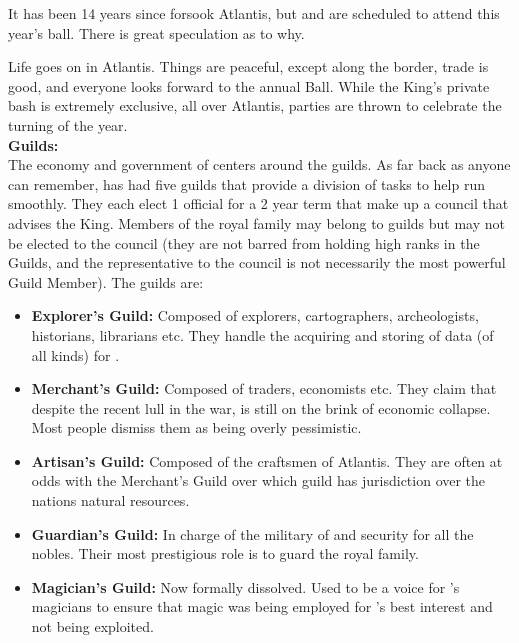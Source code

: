 \documentclass[blue]{NeptuneBall}
\begin{document}
It has been 14 years since \cAriel{\MYname{}} forsook Atlantis, but \cAriel{\they{}} and \cAriel{\their{}} \cEric{\spouse{}} are scheduled to attend this year's ball. There is great speculation as to why.

Life goes on in Atlantis. Things are peaceful, except along the border, trade is good, and everyone looks forward to the annual \cExExKing{} Ball. While the King's private bash is extremely exclusive, all over Atlantis, parties are thrown to celebrate the turning of the year.\\

{\bf Guilds:}\\
The economy and government of \pAtlantis{} centers around the guilds. As far back as anyone can remember, \pAtlantis{} has had five guilds that provide a division of tasks to help \pAtlantis{} run smoothly. They each elect 1 official for a 2 year term that make up a council that advises the King.  Members of the royal family may belong to guilds but may not be elected to the council (they are not barred from holding high ranks in the Guilds, and the representative to the council is not necessarily the most powerful Guild Member). The guilds are:
\begin{itemize}
  \item {\bf Explorer's Guild:} Composed of explorers, cartographers, archeologists, historians, librarians etc. They handle the acquiring and storing of data (of all kinds) for \pAtlantis{}.
  \item{\bf Merchant's Guild:} Composed of traders, economists etc. They claim that despite the recent lull in the war, \pAtlantis{} is  still on the brink of economic collapse. Most people dismiss them as being overly pessimistic.
  \item {\bf Artisan's Guild:} Composed of the craftsmen of Atlantis. They are often at odds with the Merchant's Guild over which guild has jurisdiction over the nations natural resources.
  \item {\bf Guardian's Guild:} In charge of the military of \pAtlantis{} and security for all the nobles. Their most prestigious role is to guard the royal family.
  \item {\bf Magician's Guild:}  Now formally dissolved. Used to be a voice for \pAtlatis{}'s magicians to ensure that magic was being employed for \pAtlantis{}'s best interest and not being exploited.
\end{itemize}
\end{document}
